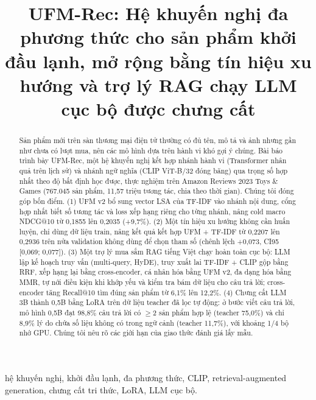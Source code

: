 \documentclass[conference,a4paper]{IEEEtran}
\begin{document}
\title{UFM-Rec: Hệ khuyến nghị đa phương thức cho sản phẩm khởi đầu lạnh, mở rộng bằng tín hiệu xu hướng và trợ lý RAG chạy LLM cục bộ được chưng cất}

\author{
}

\maketitle

\begin{abstract}
Sản phẩm mới trên sàn thương mại điện tử thường có đủ tên, mô tả và ảnh nhưng gần như chưa có lượt mua, nên các mô hình dựa trên hành vi khó gợi ý chúng. Bài báo trình bày UFM-Rec, một hệ khuyến nghị kết hợp nhánh hành vi (Transformer nhân quả trên lịch sử) và nhánh ngữ nghĩa (CLIP ViT-B/32 đóng băng) qua trọng số hợp nhất theo độ bất định học được, thực nghiệm trên Amazon Reviews 2023 Toys \& Games (767.045 sản phẩm, 11,57 triệu tương tác, chia theo thời gian). Chúng tôi đóng góp bốn điểm. (1) UFM v2 bổ sung vector LSA của TF-IDF vào nhánh nội dung, cổng hợp nhất biết số tương tác và loss xếp hạng riêng cho từng nhánh, nâng cold macro NDCG@10 từ 0,1855 lên 0,2035 (+9,7\%). (2) Một tín hiệu xu hướng không cần huấn luyện, chỉ dùng dữ liệu train, nâng kết quả kết hợp UFM + TF-IDF từ 0,2207 lên 0,2936 trên nửa validation không dùng để chọn tham số (chênh lệch +0,073, CI95 [0,069; 0,077]). (3) Một trợ lý mua sắm RAG tiếng Việt chạy hoàn toàn cục bộ: LLM lập kế hoạch truy vấn (multi-query, HyDE), truy xuất lai TF-IDF + CLIP gộp bằng RRF, xếp hạng lại bằng cross-encoder, cá nhân hóa bằng UFM v2, đa dạng hóa bằng MMR, tự nới điều kiện khi khớp yếu và kiểm tra bám dữ liệu cho câu trả lời; cross-encoder tăng Recall@10 tìm đúng sản phẩm từ 6,1\% lên 12,2\%. (4) Chưng cất LLM 3B thành 0,5B bằng LoRA trên dữ liệu teacher đã lọc tự động: ở bước viết câu trả lời, mô hình 0,5B đạt 98,8\% câu trả lời có $\geq$2 sản phẩm hợp lệ (teacher 75,0\%) và chỉ 8,9\% lý do chứa số liệu không có trong ngữ cảnh (teacher 11,7\%), với khoảng 1/4 bộ nhớ GPU. Chúng tôi nêu rõ các giới hạn của giao thức đánh giá lấy mẫu.
\end{abstract}

\begin{IEEEkeywords}
hệ khuyến nghị, khởi đầu lạnh, đa phương thức, CLIP, retrieval-augmented generation, chưng cất tri thức, LoRA, LLM cục bộ.
\end{IEEEkeywords}
\end{document}
